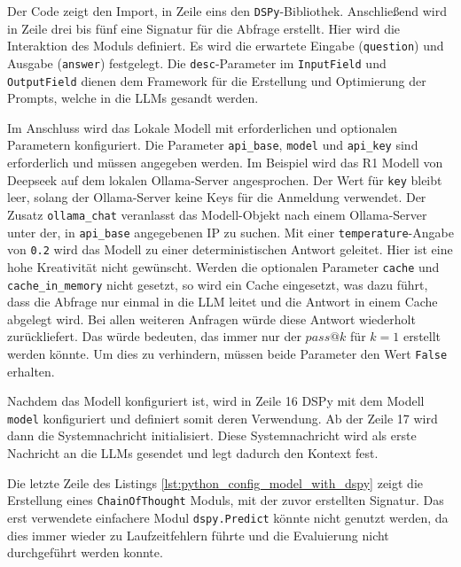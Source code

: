 Der Code zeigt den Import, in Zeile eins den \texttt{DSPy}-Bibliothek. Anschließend wird in Zeile drei bis fünf eine Signatur für die Abfrage erstellt. Hier wird die Interaktion des Moduls definiert. Es wird die erwartete Eingabe (\texttt{question}) und Ausgabe (\texttt{answer}) festgelegt. Die \texttt{desc}-Parameter im \texttt{InputField} und \texttt{OutputField} dienen dem Framework für die Erstellung und Optimierung der Prompts, welche in die LLMs gesandt werden.\vspace{0.2cm}

Im Anschluss wird das Lokale Modell mit erforderlichen und optionalen Parametern konfiguriert. Die Parameter \texttt{api\_base}, \texttt{model} und \texttt{api\_key} sind erforderlich und müssen angegeben werden. Im Beispiel wird das R1 Modell von Deepseek auf dem lokalen Ollama-Server angesprochen. Der Wert für \texttt{key} bleibt leer, solang der Ollama-Server keine Keys für die Anmeldung verwendet. Der Zusatz \texttt{ollama\_chat} veranlasst das Modell-Objekt nach einem Ollama-Server unter der, in \texttt{api\_base} angegebenen IP zu suchen. Mit einer \texttt{temperature}-Angabe von \texttt{0.2} wird das Modell zu einer deterministischen Antwort geleitet. Hier ist eine hohe Kreativität nicht gewünscht. Werden die optionalen Parameter \texttt{cache} und \texttt{cache\_in\_memory} nicht gesetzt, so wird ein Cache eingesetzt, was dazu führt, dass die Abfrage nur einmal in die LLM leitet und die Antwort in einem Cache abgelegt wird. Bei allen weiteren Anfragen würde diese Antwort wiederholt zurückliefert. Das würde bedeuten, das immer nur der $pass@k$ für $k=1$ erstellt werden könnte. Um dies zu verhindern, müssen beide Parameter den Wert \texttt{False} erhalten.\vspace{0.2cm}

Nachdem das Modell konfiguriert ist, wird in Zeile 16 DSPy mit dem Modell \texttt{model} konfiguriert und definiert somit deren Verwendung. Ab der Zeile 17 wird dann die Systemnachricht initialisiert. Diese Systemnachricht wird als erste Nachricht an die LLMs gesendet und legt dadurch den Kontext fest.\vspace{0.2cm}

Die letzte Zeile des Listings \ref{lst:python_config_model_with_dspy} zeigt die Erstellung eines \texttt{ChainOfThought} Moduls, mit der zuvor erstellten Signatur. Das erst verwendete einfachere Modul \texttt{dspy.Predict} könnte nicht genutzt werden, da dies immer wieder zu Laufzeitfehlern führte und die Evaluierung nicht durchgeführt werden konnte.


